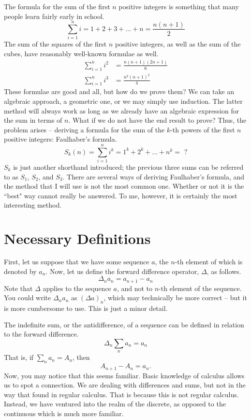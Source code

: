 \documentclass[a4paper]{article}
\theoremstyle{definition}
\begin{document}
The formula for the sum of the first $n$ positive integers is something that many people learn fairly early in school.
\begin{equation*}
    \sum_{i=1}^{n} i = 1 + 2 + 3 + \ldots + n = \frac{n(n+1)}{2}
\end{equation*}
The sum of the squares of the first $n$ positive integers, as well as the sum of the cubes, have reasonably well-known formulae as well.
\begin{align*}
    \sum_{i=1}^{n} i^2 & = \frac{n(n+1)(2n+1)}{6} \\
    \sum_{i=1}^{n} i^3 & = \frac{n^2 (n+1)^2}{4}
\end{align*}
These formulae are good and all, but how do we prove them?
We can take an algebraic approach, a geometric one, or we may simply use induction.
The latter method will always work as long as we already have an algebraic expression for the sum in terms of $n$.
What if we do not have the end result to prove?
Thus, the problem arises -- deriving a formula for the sum of the $k$-th powers of the first $n$ positive integers: Faulhaber's formula.
\begin{equation*}
    S_k(n) = \sum_{i=1}^{n} i^k = 1^k + 2^k + ... + n^k = \text{ ?}
\end{equation*}
$S_k$ is just another shorthand introduced; the previous three sums can be referred to as $S_1$, $S_2$, and $S_3$.
There are several ways of deriving Faulhaber's formula, and the method that I will use is not the most common one.
Whether or not it is the ``best" way cannot really be answered. To me, however, it is certainly the most interesting method.

\section{Necessary Definitions}

First, let us suppose that we have some sequence $a$, the $n$-th element of which is denoted by $a_n$.
Now, let us define the forward difference operator, $\Delta$, as follows.
\begin{equation}
    \Delta_n a_n = a_{n+1} - a_n
\end{equation}
Note that $\Delta$ applies to the sequence $a$, and not to $n$-th element of the sequence.
You could write $\Delta_n a_n$ as $(\Delta a)_n$, which may technically be more correct -- but it is more cumbersome to use.
This is just a minor detail.

The indefinite sum, or the antidifference, of a sequence can be defined in relation to the forward difference.
\begin{equation}
    \Delta_n \sum_n a_n = a_n
\end{equation}
That is, if $\sum_n a_n = A_n$, then
\begin{equation}
    A_{n+1} - A_n = a_n.
\end{equation}
Now, you may notice that this seems familiar.
Basic knowledge of calculus allows us to spot a connection.
We are dealing with differences and sums, but not in the way that found in regular calculus.
That is because this is not regular calculus.
Instead, we have ventured into the realm of the discrete, as opposed to the continuous which is much more familiar.
\end{document}
